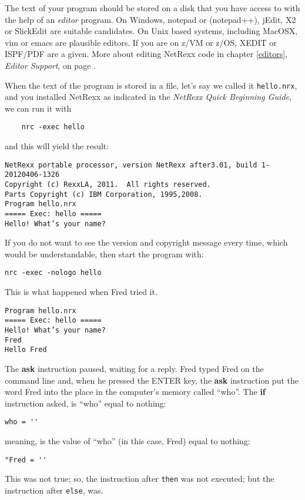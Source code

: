 \documentclass[10pt]{book}
\begin{document}
The text of your program should be stored on a disk that you have
access to with the help of an \emph{editor} program. On Windows,
notepad or (notepad++), jEdit, X2 or SlickEdit are suitable
candidates. On Unix based systems, including MacOSX, vim or emacs are
plausible editors. If you are on z/VM or z/OS, XEDIT or ISPF/PDF are a
given. More about editing NetRexx code in chapter \ref{editors},
\emph{Editor Support}, on page \pageref{editors}. 

When the text of the program is stored in a file, let's say we called
it \texttt{hello.nrx}, and you installed NetRexx as indicated in the
\emph{NetRexx Quick Beginning Guide}, we can run it with
\begin{verbatim}
    nrc -exec hello
\end{verbatim}
and this will yield the result:
\begin{verbatim}
NetRexx portable processor, version NetRexx after3.01, build 1-20120406-1326
Copyright (c) RexxLA, 2011.  All rights reserved.
Parts Copyright (c) IBM Corporation, 1995,2008.
Program hello.nrx
===== Exec: hello =====
Hello! What’s your name?
\end{verbatim}
If you do not want to see the version and copyright message every
time, which would be understandable, then start the program with:
\begin{verbatim}
nrc -exec -nologo hello
\end{verbatim}
This is what happened when Fred tried it.
\begin{verbatim}
Program hello.nrx
===== Exec: hello =====
Hello! What’s your name?
Fred
Hello Fred
\end{verbatim}
The \textbf{ask} instruction paused, waiting for a reply. Fred typed
Fred on the command line and, when he pressed the ENTER key, the
\textbf{ask} instruction put the word Fred into the place in the
computer's memory called ``who''. The \textbf{if} instruction asked,
is ``who'' equal to nothing:
\begin{verbatim}
who = '' 
\end{verbatim}
meaning, is the value of ``who''  (in this case, Fred) equal to
nothing:
\begin{verbatim}
"Fred = ''
\end{verbatim}
This was not true; so, the instruction after \texttt{then} was not executed; but the instruction
after \texttt{else}, was.
\end{document}
